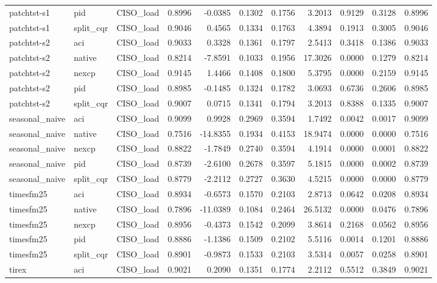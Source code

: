 \begin{tabular}{lllrrrrrrrr}
patchtst-s1 & pid & CISO_load & 0.8996 & -0.0385 & 0.1302 & 0.1756 & 3.2013 & 0.9129 & 0.3128 & 0.8996 \\
patchtst-s1 & split_cqr & CISO_load & 0.9046 & 0.4565 & 0.1334 & 0.1763 & 4.3894 & 0.1913 & 0.3005 & 0.9046 \\
patchtst-s2 & aci & CISO_load & 0.9033 & 0.3328 & 0.1361 & 0.1797 & 2.5413 & 0.3418 & 0.1386 & 0.9033 \\
patchtst-s2 & native & CISO_load & 0.8214 & -7.8591 & 0.1033 & 0.1956 & 17.3026 & 0.0000 & 0.1279 & 0.8214 \\
patchtst-s2 & nexcp & CISO_load & 0.9145 & 1.4466 & 0.1408 & 0.1800 & 5.3795 & 0.0000 & 0.2159 & 0.9145 \\
patchtst-s2 & pid & CISO_load & 0.8985 & -0.1485 & 0.1324 & 0.1782 & 3.0693 & 0.6736 & 0.2606 & 0.8985 \\
patchtst-s2 & split_cqr & CISO_load & 0.9007 & 0.0715 & 0.1341 & 0.1794 & 3.2013 & 0.8388 & 0.1335 & 0.9007 \\
seasonal_naive & aci & CISO_load & 0.9099 & 0.9928 & 0.2969 & 0.3594 & 1.7492 & 0.0042 & 0.0017 & 0.9099 \\
seasonal_naive & native & CISO_load & 0.7516 & -14.8355 & 0.1934 & 0.4153 & 18.9474 & 0.0000 & 0.0000 & 0.7516 \\
seasonal_naive & nexcp & CISO_load & 0.8822 & -1.7849 & 0.2740 & 0.3594 & 4.1914 & 0.0000 & 0.0001 & 0.8822 \\
seasonal_naive & pid & CISO_load & 0.8739 & -2.6100 & 0.2678 & 0.3597 & 5.1815 & 0.0000 & 0.0002 & 0.8739 \\
seasonal_naive & split_cqr & CISO_load & 0.8779 & -2.2112 & 0.2727 & 0.3630 & 4.5215 & 0.0000 & 0.0000 & 0.8779 \\
timesfm25 & aci & CISO_load & 0.8934 & -0.6573 & 0.1570 & 0.2103 & 2.8713 & 0.0642 & 0.0208 & 0.8934 \\
timesfm25 & native & CISO_load & 0.7896 & -11.0389 & 0.1084 & 0.2464 & 26.5132 & 0.0000 & 0.0476 & 0.7896 \\
timesfm25 & nexcp & CISO_load & 0.8956 & -0.4373 & 0.1542 & 0.2099 & 3.8614 & 0.2168 & 0.0562 & 0.8956 \\
timesfm25 & pid & CISO_load & 0.8886 & -1.1386 & 0.1509 & 0.2102 & 5.5116 & 0.0014 & 0.1201 & 0.8886 \\
timesfm25 & split_cqr & CISO_load & 0.8901 & -0.9873 & 0.1533 & 0.2103 & 3.5314 & 0.0057 & 0.0258 & 0.8901 \\
tirex & aci & CISO_load & 0.9021 & 0.2090 & 0.1351 & 0.1774 & 2.2112 & 0.5512 & 0.3849 & 0.9021 \\

\end{tabular}
